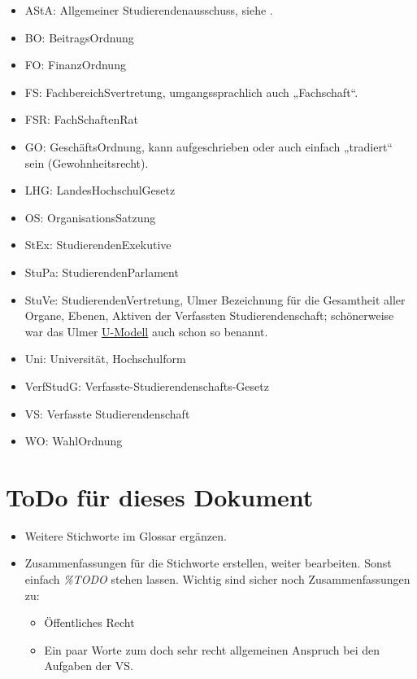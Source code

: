 \documentclass[
10pt,
a4paper,
twoside,								%
titlepage=false,							%
draft=false								%
]{scrartcl}
\begin{document}
\begin{itemize}
	\item AStA: Allgemeiner Studierendenausschuss, siehe .
	\item BO: BeitragsOrdnung
	\item FO: FinanzOrdnung
	\item FS: FachbereichSvertretung, umgangssprachlich auch „Fachschaft“.
	\item FSR: FachSchaftenRat
	\item GO: GeschäftsOrdnung, kann aufgeschrieben oder auch einfach „tradiert“ sein (Gewohnheitsrecht).
	\item LHG: LandesHochschulGesetz
	\item OS: OrganisationsSatzung
	\item StEx: StudierendenExekutive
	\item StuPa: StudierendenParlament
	\item StuVe: StudierendenVertretung, Ulmer Bezeichnung für die Gesamtheit aller Organe, Ebenen, Aktiven der Verfassten Studierendenschaft; schönerweise war das Ulmer \href{https://de.wikipedia.org/wiki/Unabh\%C3\%A4ngige_Studierendenschaft}{U-Modell} auch schon so benannt.
	\item Uni: Universität, Hochschulform
	\item VerfStudG: Verfasste-Studierendenschafts-Gesetz
	\item VS: Verfasste Studierendenschaft
	\item WO: WahlOrdnung
\end{itemize}

\section*{ToDo für dieses Dokument}

\begin{itemize}
	\item Weitere Stichworte im Glossar ergänzen.
	\item Zusammenfassungen für die Stichworte erstellen, weiter bearbeiten. Sonst einfach \textit{\%TODO} stehen lassen. Wichtig sind sicher noch Zusammenfassungen zu:
	\begin{itemize}
		\item Öffentliches Recht
		\item Ein paar Worte zum doch sehr recht allgemeinen Anspruch bei den Aufgaben der VS.
	\end{itemize}
\end{itemize}
\end{document}
